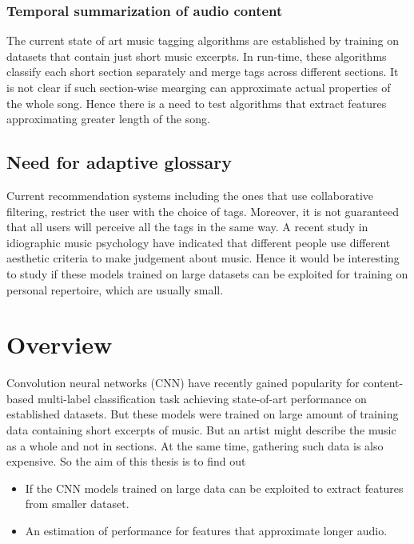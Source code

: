 \subsubsection{Temporal summarization of audio content}
The current state of art music tagging algorithms\cite{choi_crnn}\cite{MultiScale} are established by training on datasets that contain just short music excerpts. In run-time, these algorithms classify each short section separately and merge tags across different sections. It is not clear if such section-wise mearging can approximate actual properties of the whole song. Hence there is a need to test algorithms that extract features approximating greater length of the song. 

\subsection{Need for adaptive glossary}
Current recommendation systems including the ones that use collaborative filtering, restrict the user with the choice of tags. Moreover, it is not guaranteed that all users will perceive all the tags in the same way. A recent study in idiographic music psychology have indicated that different people use different aesthetic criteria to make judgement about music\cite{NoAccountingForTaste}. Hence it would be interesting to study if these models \cite{choi_cnn}\cite{choi_crnn} trained on large datasets can be exploited for training on personal repertoire, which are usually small.  


\section{Overview}
\label{overview}
Convolution neural networks (CNN) have recently gained popularity for content-based multi-label classification task achieving state-of-art performance on established datasets\cite{choi_cnn}\cite{choi_rnn}. But these models were trained on large amount of training data containing short excerpts of music. But an artist might describe the music as a whole and not in sections. At the same time, gathering such data is also expensive. So the aim of this thesis is to find out
\begin{itemize}
\setlength\itemsep{0em}
\item If the CNN models trained on large data can be exploited to extract features from smaller dataset.
\item An estimation of performance for features that approximate longer audio.
\end{itemize} 
    
